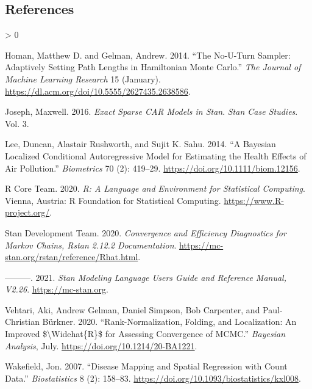 \documentclass[
]{article}
\newlength{\cslhangindent}
\newenvironment{CSLReferences}[2] %
 {%
  \setlength{\parindent}{0pt}
  \ifodd #1 \everypar{\setlength{\hangindent}{\cslhangindent}}\ignorespaces\fi
  \ifnum #2 > 0
  \setlength{\parskip}{#2\baselineskip}
  \fi
 }%
 {}
\begin{document}
\newpage

\hypertarget{references}{%
\subsection*{References}\label{references}}

\hypertarget{refs}{}
\begin{CSLReferences}{1}{0}
\leavevmode\hypertarget{ref-homan_no-u-turn_2014}{}%
Homan, Matthew D. and Gelman, Andrew. 2014. {``The {No}-{U}-Turn
Sampler: Adaptively Setting Path Lengths in {Hamiltonian} {Monte}
{Carlo}.''} \emph{The Journal of Machine Learning Research} 15
(January). \url{https://dl.acm.org/doi/10.5555/2627435.2638586}.

\leavevmode\hypertarget{ref-exact-sparse-car}{}%
Joseph, Maxwell. 2016. \emph{{Exact Sparse CAR Models in Stan}}.
\emph{Stan Case Studies}. Vol. 3.

\leavevmode\hypertarget{ref-lee_bayesian_2014}{}%
Lee, Duncan, Alastair Rushworth, and Sujit K. Sahu. 2014. {``A
{Bayesian} Localized Conditional Autoregressive Model for Estimating the
Health Effects of Air Pollution.''} \emph{Biometrics} 70 (2): 419--29.
\url{https://doi.org/10.1111/biom.12156}.

\leavevmode\hypertarget{ref-R-base}{}%
R Core Team. 2020. \emph{R: A Language and Environment for Statistical
Computing}. Vienna, Austria: R Foundation for Statistical Computing.
\url{https://www.R-project.org/}.

\leavevmode\hypertarget{ref-rhat}{}%
Stan Development Team. 2020. \emph{Convergence and Efficiency
Diagnostics for Markov Chains, Rstan 2.12.2 Documentation}.
\url{https://mc-stan.org/rstan/reference/Rhat.html}.

\leavevmode\hypertarget{ref-Stan}{}%
---------. 2021. \emph{Stan Modeling Language Users Guide and Reference
Manual, V2.26}. \url{https://mc-stan.org}.

\leavevmode\hypertarget{ref-vehtari_rank-normalization_2020}{}%
Vehtari, Aki, Andrew Gelman, Daniel Simpson, Bob Carpenter, and
Paul-Christian Bürkner. 2020. {``Rank-Normalization, Folding, and
Localization: {An} Improved \${\textbackslash{}}Widehat\{{R}\}\$ for
Assessing Convergence of {MCMC}.''} \emph{Bayesian Analysis}, July.
\url{https://doi.org/10.1214/20-BA1221}.

\leavevmode\hypertarget{ref-wakefield_disease_2007}{}%
Wakefield, Jon. 2007. {``Disease Mapping and Spatial Regression with
Count Data.''} \emph{Biostatistics} 8 (2): 158--83.
\url{https://doi.org/10.1093/biostatistics/kxl008}.

\end{CSLReferences}
\end{document}

